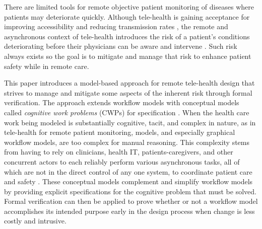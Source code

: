 There are limited tools for remote objective patient monitoring of diseases where patients may deteriorate quickly. Although tele-health is gaining acceptance for improving accessibility and reducing transmission rates \cite{10.1093/jamia/ocaa048,telehealth,10.1093/jamia/ocaa067}, the remote and asynchronous context of tele-health introduces the risk of a patient's conditions deteriorating before their physicians can be aware and intervene \cite{10.1097/ALN.0000000000003578}. Such risk always exists so the goal is to mitigate and manage that risk to enhance patient safety while in remote care. 

\begin{comment}
  Remote patient monitoring relies on clinicians, health IT, patients-caregivers, and other concurrent actors to each reliably perform various asynchronous tasks to coordinate patient care and safety \cite{remote,Aalam229}. Designing such systems becomes complex quickly because actors are outside the direct control of the system. These distributed and asynchronous characteristics make manual reasoning about functional integration and safety early in the design process very difficult; and yet, early in the design process is exactly the time to clearly establish the utility of the design in fulfilling its intended purpose. 
\end{comment}

This paper introduces a model-based approach for remote tele-health design that strives to manage and mitigate some aspects of the inherent risk through formal verification. The approach extends workflow models with conceptual models called \emph{cognitive work problems} (CWPs) for specification \cite{workflowmodel,workcentered,BERRY201615,chi2010}. When the health care work being modeled is substantially cognitive, tacit, and complex in nature, as in tele-health for remote patient monitoring, models, and especially graphical workflow models, are too complex for manual reasoning. This complexity stems from having to rely on clinicians, health IT, patients-caregivers, and other concurrent actors to each reliably perform various asynchronous tasks, all of which are not in the direct control of any one system, to coordinate patient care and safety \cite{remote,Aalam229}. These conceptual models complement and simplify workflow models by providing explicit specifications for the cognitive problem that must be solved. Formal verification can then be applied to prove whether or not a workflow model accomplishes its intended purpose early in the design process when change is less costly and intrusive.

